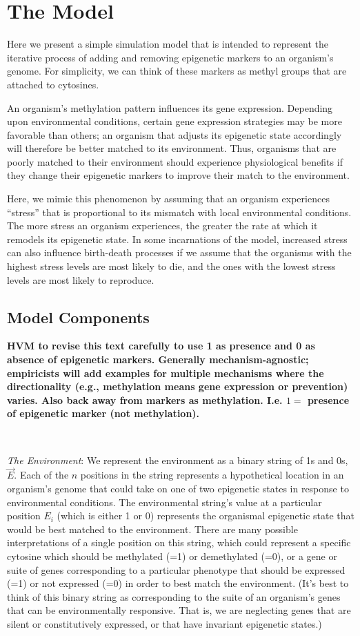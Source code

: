 \documentclass{article}
\begin{document}
\section{The Model}
Here we present a simple simulation model that is intended to represent the iterative process of adding and removing epigenetic markers to an organism's genome. For simplicity, we can think of these markers as methyl groups that are attached to cytosines. 

An organism's methylation pattern influences its gene expression. Depending upon environmental conditions, certain gene expression strategies may be more favorable than others; an organism that adjusts its epigenetic state accordingly will therefore be better matched to its environment. Thus, organisms that are poorly matched to their environment should experience physiological benefits if they change their epigenetic markers to improve their match to the environment.

Here, we mimic this phenomenon by assuming that an organism experiences ``stress'' that is proportional to its mismatch with local environmental conditions. The more stress an organism experiences, the greater the rate at which it remodels its epigenetic state. In some incarnations of the model, increased stress can also influence birth-death processes if we assume that the organisms with the highest stress levels are most likely to die, and the ones with the lowest stress levels are most likely to reproduce.

\subsection{Model Components}

\textbf{HVM to revise this text carefully to use 1 as presence and 0 as absence of epigenetic markers. Generally mechanism-agnostic; empiricists will add examples for multiple mechanisms where the directionality (e.g., methylation means gene expression or prevention) varies. Also back away from markers as methylation. I.e. $1 = $ presence of epigenetic marker (not methylation).}

\ 

\noindent \textit{The Environment}: We represent the environment as a binary string of 1s and 0s, $\vec{E}$. Each of the $n$ positions in the string represents a hypothetical location in an organism's genome that could take on one of two epigenetic states in response to environmental conditions. The environmental string's value at a particular position $E_i$ (which is either 1 or 0) represents the organismal epigenetic state that would be best matched to the environment. There are many possible interpretations of a single position on this string, which could represent a specific cytosine which should be methylated (=1) or demethylated (=0), or a gene or suite of genes corresponding to a particular phenotype that should be expressed (=1) or not expressed (=0) in order to best match the environment. (It's best to think of this binary string as corresponding to the suite of an organism's genes that can be environmentally responsive. That is, we are neglecting genes that are silent or constitutively expressed, or that have invariant epigenetic states.)
\end{document}
